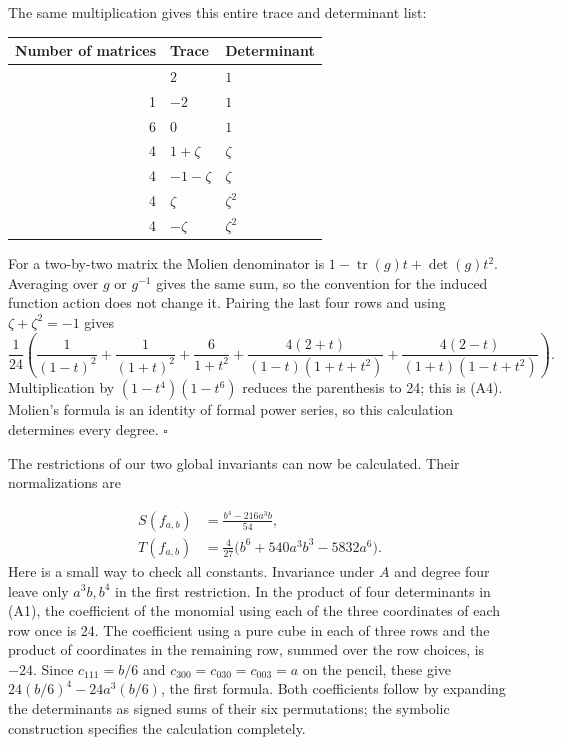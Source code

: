 \documentclass[
]{article}
\newcounter{none} %
\begin{document}
The same multiplication gives this entire trace and determinant list:

{\def\LTcaptype{none} %
\begin{longtable}[]{@{}rll@{}}
\toprule\noalign{}
Number of matrices & Trace & Determinant \\
\midrule\noalign{}
\endhead
\bottomrule\noalign{}
\endlastfoot
1 & \(2\) & \(1\) \\
1 & \(-2\) & \(1\) \\
6 & \(0\) & \(1\) \\
4 & \(1+\zeta\) & \(\zeta\) \\
4 & \(-1-\zeta\) & \(\zeta\) \\
4 & \(\zeta\) & \(\zeta^2\) \\
4 & \(-\zeta\) & \(\zeta^2\) \\
\end{longtable}
}

For a two-by-two matrix the Molien denominator is
\(1-\operatorname{tr}(g)t+\det(g)t^2\). Averaging over \(g\) or
\(g^{-1}\) gives the same sum, so the convention for the induced
function action does not change it. Pairing the last four rows and using
\(\zeta+\zeta^2=-1\) gives \[
\frac1{24}\left(
\frac1{(1-t)^2}+\frac1{(1+t)^2}+\frac6{1+t^2}
+\frac{4(2+t)}{(1-t)(1+t+t^2)}
+\frac{4(2-t)}{(1+t)(1-t+t^2)}\right).
\] Multiplication by \((1-t^4)(1-t^6)\) reduces the parenthesis to 24;
this is (A4). Molien's formula is an identity of formal power series, so
this calculation determines every degree. \(\square\)

The restrictions of our two global invariants can now be calculated.
Their normalizations are \protect{}\label{equation-A5}{}

\[
\begin{split}
S(f_{a,b})&=\frac{b^4-216a^3b}{54},\\
T(f_{a,b})&=\frac4{27}
\bigl(b^6+540a^3b^3-5832a^6\bigr).
\end{split}
\tag{A5}
\] Here is a small way to check all constants. Invariance under \(A\)
and degree four leave only \(a^3b,b^4\) in the first restriction. In the
product of four determinants in (A1), the coefficient of the monomial
using each of the three coordinates of each row once is 24. The
coefficient using a pure cube in each of three rows and the product of
coordinates in the remaining row, summed over the row choices, is
\(-24\). Since \(c_{111}=b/6\) and \(c_{300}=c_{030}=c_{003}=a\) on the
pencil, these give \(24(b/6)^4-24a^3(b/6)\), the first formula. Both
coefficients follow by expanding the determinants as signed sums of
their six permutations; the symbolic construction specifies the
calculation completely.
\end{document}
